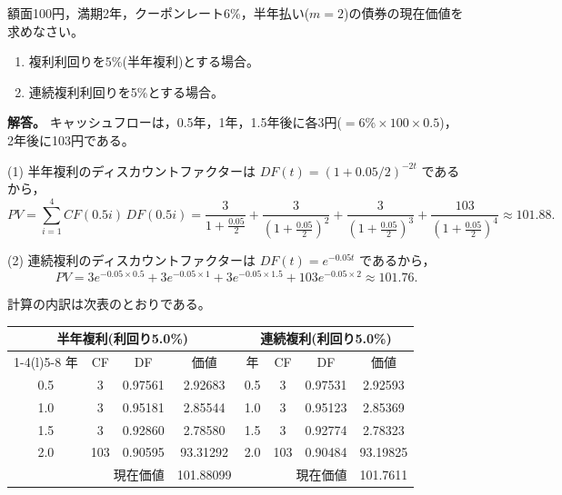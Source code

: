 \begin{example}[例題3-1：債券の現在価値]
額面100円，満期2年，クーポンレート6\%，半年払い($m=2$)の債券の現在価値を
求めなさい。
\begin{enumerate}
\item[(1)] 複利利回りを5\%(半年複利)とする場合。
\item[(2)] 連続複利利回りを5\%とする場合。
\end{enumerate}

\medskip
\noindent\textbf{解答。}
キャッシュフローは，0.5年，1年，1.5年後に各3円($=6\%\times 100\times 0.5$)，
2年後に103円である。

(1) 半年複利のディスカウントファクターは $DF(t) = (1+0.05/2)^{-2t}$ であるから，
\[
PV = \sum_{i=1}^{4} CF(0.5i)\,DF(0.5i)
= \frac{3}{1+\frac{0.05}{2}} + \frac{3}{(1+\frac{0.05}{2})^2}
+ \frac{3}{(1+\frac{0.05}{2})^3} + \frac{103}{(1+\frac{0.05}{2})^4}
\approx 101.88.
\]

(2) 連続複利のディスカウントファクターは $DF(t) = e^{-0.05t}$ であるから，
\[
PV = 3e^{-0.05\times 0.5} + 3e^{-0.05\times 1} + 3e^{-0.05\times 1.5}
+ 103e^{-0.05\times 2} \approx 101.76.
\]

計算の内訳は次表のとおりである。
\vspace{0.9em}
\begin{center}
\small
\begin{tabular}{cccc@{\qquad}cccc}
\toprule
\multicolumn{4}{c}{半年複利(利回り5.0\%)} & \multicolumn{4}{c}{連続複利(利回り5.0\%)}\\
\cmidrule(r){1-4}\cmidrule(l){5-8}
年 & CF & DF & 価値 & 年 & CF & DF & 価値\\
\midrule
0.5 & 3 & 0.97561 & 2.92683 & 0.5 & 3 & 0.97531 & 2.92593\\
1.0 & 3 & 0.95181 & 2.85544 & 1.0 & 3 & 0.95123 & 2.85369\\
1.5 & 3 & 0.92860 & 2.78580 & 1.5 & 3 & 0.92774 & 2.78323\\
2.0 & 103 & 0.90595 & 93.31292 & 2.0 & 103 & 0.90484 & 93.19825\\
\midrule
\multicolumn{3}{r}{現在価値} & 101.88099 & \multicolumn{3}{r}{現在価値} & 101.7611\\
\bottomrule
\end{tabular}
\end{center}
\vspace{0.9em}
\end{example}

\vspace{18pt}

